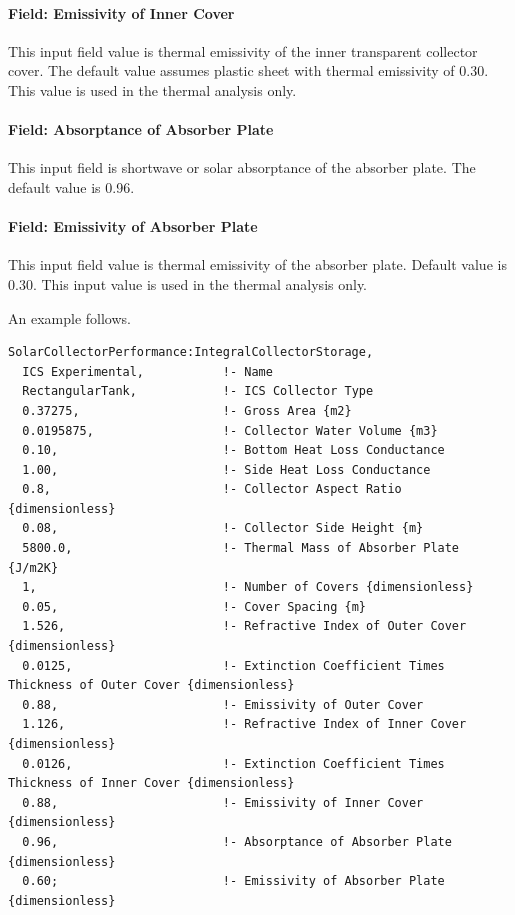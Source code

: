 \paragraph{Field: Emissivity of Inner Cover}\label{field-emissivity-of-inner-cover}

This input field value is thermal emissivity of the inner transparent collector cover. The default value assumes plastic sheet with thermal emissivity of 0.30. This value is used in the thermal analysis only.

\paragraph{Field: Absorptance of Absorber Plate}\label{field-absorptance-of-absorber-plate}

This input field is shortwave or solar absorptance of the absorber plate. The default value is 0.96.

\paragraph{Field: Emissivity of Absorber Plate}\label{field-emissivity-of-absorber-plate}

This input field value is thermal emissivity of the absorber plate. Default value is 0.30. This input value is used in the thermal analysis only.

An example follows.

\begin{lstlisting}
SolarCollectorPerformance:IntegralCollectorStorage,
  ICS Experimental,           !- Name
  RectangularTank,            !- ICS Collector Type
  0.37275,                    !- Gross Area {m2}
  0.0195875,                  !- Collector Water Volume {m3}
  0.10,                       !- Bottom Heat Loss Conductance
  1.00,                       !- Side Heat Loss Conductance
  0.8,                        !- Collector Aspect Ratio {dimensionless}
  0.08,                       !- Collector Side Height {m}
  5800.0,                     !- Thermal Mass of Absorber Plate {J/m2K}
  1,                          !- Number of Covers {dimensionless}
  0.05,                       !- Cover Spacing {m}
  1.526,                      !- Refractive Index of Outer Cover {dimensionless}
  0.0125,                     !- Extinction Coefficient Times Thickness of Outer Cover {dimensionless}
  0.88,                       !- Emissivity of Outer Cover
  1.126,                      !- Refractive Index of Inner Cover {dimensionless}
  0.0126,                     !- Extinction Coefficient Times Thickness of Inner Cover {dimensionless}
  0.88,                       !- Emissivity of Inner Cover {dimensionless}
  0.96,                       !- Absorptance of Absorber Plate {dimensionless}
  0.60;                       !- Emissivity of Absorber Plate {dimensionless}
\end{lstlisting}


